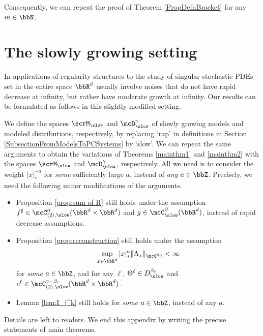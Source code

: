 Consequently, we can repeat the proof of Theorem \ref{PropDefnBracket} for any $m\in\bbN$.

\section{The slowly growing setting}
\label{AppendixSlow}

In applications of regularity structures to the study of singular stochastic PDEs set in the entire space $\bbR^d$ usually involve noises that do not have rapid decrease at infinity, but rather have moderate growth at infinity. Our results can be formulated as follows in this slightly modified setting.

We define the spaces $\scrM_{\slow}$ and $\mcD_{\slow}^\gamma$ of slowly growing models and modeled distributions, respectively, by replacing `rap' in definitions in Section \ref{SubsectionFromModelsToPCSystems} by `slow'. We can repeat the same arguments to obtain the variations of Theorems \ref{mainthm1} and \ref{mainthm2} with the spaces $\scrM_{\slow}$ and $\mcD_{\slow}^\gamma$, respectively.
All we need is to consider the weight $|x|_*^{-a}$ for {\it some} sufficiently large $a$, instead of {\it any} $a\in\bbZ$.
Precisely, we need the following minor modifications of the arguments.
\begin{itemize}
\item Proposition \ref{prop:sum of R} still holds under the assumption $f^\sharp\in\mcC_{(2),\slow}^\alpha(\bbR^d\times\bbR^d)$ and $g\in\mcC_{\slow}^\beta(\bbR^d)$, instead of rapid decrease assumptions.
\item Proposition \ref{prop:reconstruction} still holds under the assumption
\[
\sup_{x\in\bbR^d}|x|_*^a\|\Lambda_x\|_{\mcC^{\beta_0}}<\infty
\]
for {\it some} $a\in\bbZ$, and for any $\ell$, $\Theta^\ell\in D_{\slow}^{\beta_\ell}$ and $c^\ell\in\mcC_{(2),\slow}^{\gamma-\beta_\ell}(\bbR^d\times\bbR^d)$.
\item Lemma \ref{lem:I_j^k} still holds for {\it some} $a\in\bbZ$, instead of any $a$.
\end{itemize}
Details are left to readers. We end this appendix by writing the precise statements of main theorems.


